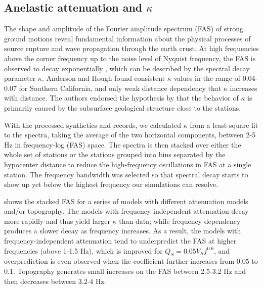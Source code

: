 \subsection{Anelastic attenuation and $\kappa$}
The shape and amplitude of the Fourier amplitude spectrum (FAS) of strong ground motions reveal fundamental information about the physical processes of source rupture and wave propagation through the earth crust. At high frequencies above the corner frequency up to the noise level of Nyquist frequency, the FAS is observed to decay exponentially \citep{anderson1984model}, which can be described by the spectral decay parameter $\kappa$. Anderson and Hough found consistent $\kappa$ values in the range of 0.04-0.07 for Southern California, and only weak distance dependency that $\kappa$ increases with distance. The authors endorsed the hypothesis by \citet{hanksFmax1982} that the behavior of $\kappa$ is primarily caused by the subsurface geological structure close to the stations.

With the processed synthetics and records, we calculated $\kappa$ from a least-square fit to the spectra, taking the average of the two horizontal components, between 2-5 Hz in frequency-log (FAS) space. The spectra is then stacked over either the whole set of stations or the stations grouped into bins separated by the hypocenter distance to reduce the high-frequency oscillations in FAS at a single station. The frequency bandwidth was selected so that spectral decay starts to show up yet below the highest frequency our simulations can resolve.

 shows the stacked FAS for a series of models with different attenuation models and/or topography. The models with frequency-independent attenuation decay more rapidly and thus yield larger $\kappa$ than data; while frequency-dependency produces a slower decay as frequency increases. As a result, the models with frequency-independent attenuation tend to underpredict the FAS at higher frequencies (above 1-1.5 Hz), which is improved for $Q_S=0.05V_Sf^{0.6}$, and overprediction is even observed when the coefficient further increases from 0.05 to 0.1. Topography generates small increases on the FAS between 2.5-3.2 Hz and then decreases between 3.2-4 Hz.

